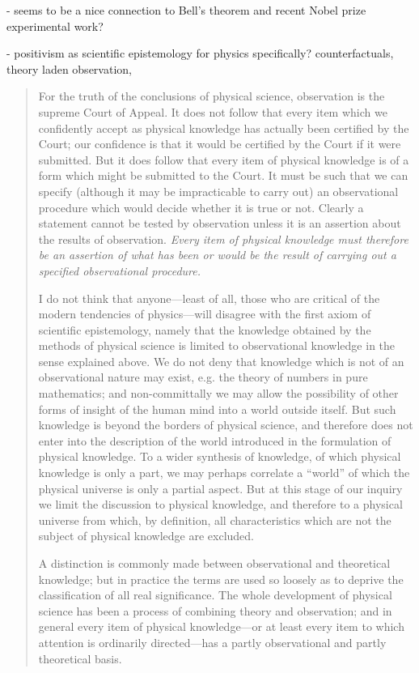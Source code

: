 - seems to be a nice connection to Bell's theorem and recent Nobel prize experimental work?

- positivism as scientific epistemology for physics specifically?  counterfactuals, theory laden observation, 

\begin{quote}
    For the truth of the conclusions of physical science, observation is the supreme Court of Appeal.  It does not follow that every item which we confidently accept as physical knowledge has actually been certified by the Court; our confidence is that it would be certified by the Court if it were submitted.  But it does follow that every item of physical knowledge is of a form which might be submitted to the Court.  It must be such that we can specify (although it may be impracticable to carry out) an observational procedure which would decide whether it is true or not.  Clearly a statement cannot be tested by observation unless it is an assertion about the results of observation.  \emph{Every item of physical knowledge must therefore be an assertion of what has been or would be the result of carrying out a specified observational procedure.}
    
    I do not think that anyone---least of all, those who are critical of the modern tendencies of physics---will disagree with the first axiom of scientific epistemology, namely that the knowledge obtained by the methods of physical science is limited to observational knowledge in the sense explained above.  We do not deny that knowledge which is not of an observational nature may exist, e.g. the theory of numbers in pure mathematics; and non-committally we may allow the possibility of other forms of insight of the human mind into a world outside itself.  But such knowledge is beyond the borders of physical science, and therefore does not enter into the description of the world introduced in the formulation of physical knowledge.  To a wider synthesis of knowledge, of which physical knowledge is only a part, we may perhaps correlate a ``world'' of which the physical universe is only a partial aspect.  But at this stage of our inquiry we limit the discussion to physical knowledge, and therefore to a physical universe from which, by definition, all characteristics which are not the subject of physical knowledge are excluded.  
    
    A distinction is commonly made between observational and theoretical knowledge; but in practice the terms are used so loosely as to deprive the classification of all real significance.  The whole development of physical science has been a process of combining theory and observation; and in general every item of physical knowledge---or at least every item to which attention is ordinarily directed---has a partly observational and partly theoretical basis. 
    
    \citep[p. 9-10]{Eddington1939}
\end{quote}


